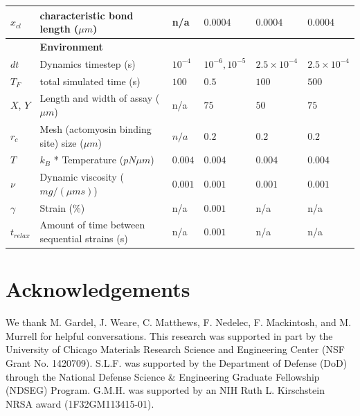 \documentclass[12pt]{article}
\newcommand{\beginsupplement}{%
  \setcounter{table}{0}
  \renewcommand{\thetable}{S\arabic{table}}%
  \setcounter{figure}{0}
  \renewcommand{\thefigure}{S\arabic{figure}}%
}
\begin{document}
\begin{table}
\begin{tabular}{|C{1cm}|L{6cm}|C{2cm}|C{2cm}|C{2cm}|C{2cm}|}
    $x_{cl}$& characteristic bond length ($\mu m$) & n/a & $0.0004$ & $0.0004$ & $0.0004$ \\
    \hline
    &\bf{Environment} & & \\
    \hline
    $dt$ & Dynamics timestep (s) & $10^{-4}$ & $10^{-6},10^{-5}$ &$2.5\times10^{-4}$ &$2.5\times10^{-4}$ \\
    $T_F$& total simulated time (s) & $100$ & $0.5$ & $100$ & $500$ \\
    $X$, $Y$ & Length and width of assay ($\mu m$)& n/a & $75$ & $50$ & $75$\\
    $r_c$ & Mesh (actomyosin binding site) size ($\mu m$) & $n/a$ & $0.2 $ & $0.2 $& $0.2 $ \\ 
    $T$ & $k_B$ * Temperature ($pN\mu m$)& $0.004$ & $0.004$& $0.004$& $0.004$\\
    $\nu$ & Dynamic viscosity ($mg/(\mu m s)$) & $0.001$& $0.001$& $0.001$& $0.001$\\
    $\gamma$ & Strain (\%) \cite{stricker2010}& n/a& $0.001$&n/a&n/a\\
    $t_{relax}$ & Amount of time between sequential strains (s)& n/a& $0.001$ &n/a&n/a\\
    \hline
  \end{tabular}
  \label{tab:params}
\end{table}



\section{Acknowledgements}  
We thank M. Gardel, J. Weare, C. Matthews, F. Nedelec, F. Mackintosh, and M. Murrell for helpful conversations. This research was supported in part by the University of Chicago Materials Research Science and Engineering Center (NSF Grant No. 1420709). S.L.F. was supported by the Department of Defense (DoD) through the National Defense Science \& Engineering Graduate Fellowship (NDSEG) Program. G.M.H. was supported by an NIH Ruth L. Kirschstein NRSA award (1F32GM113415-01).



\beginsupplement
\end{document}
